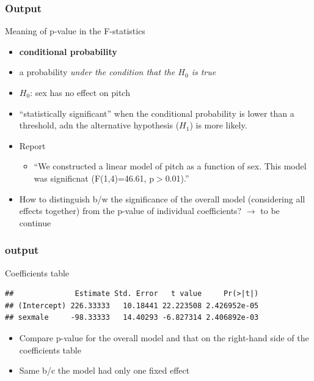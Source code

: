 \documentclass[10p]{beamer}\usepackage[]{graphicx}\usepackage[]{color}
\makeatletter
\newenvironment{kframe}{%
 \def\at@end@of@kframe{}%
 \ifinner\ifhmode%
  \def\at@end@of@kframe{\end{minipage}}%
  \begin{minipage}{\columnwidth}%
 \fi\fi%
 \def\FrameCommand##1{\hskip\@totalleftmargin \hskip-\fboxsep
 \colorbox{shadecolor}{##1}\hskip-\fboxsep
     \hskip-\linewidth \hskip-\@totalleftmargin \hskip\columnwidth}%
 \MakeFramed {\advance\hsize-\width
   \@totalleftmargin\z@ \linewidth\hsize
   \@setminipage}}%
 {\par\unskip\endMakeFramed%
 \at@end@of@kframe}
\newenvironment{knitrout}{}{} %
\makeatother
\begin{document}
\begin{frame}
\frametitle{Output}
Meaning of p-value in the F-statistics
\begin{itemize}
\item \textbf{conditional probability}
\item a probability \textit{under the condition that the $H_0$ is true}
\item $H_0$: sex has no effect on pitch
\item ``statistically significant'' when the conditional probability is lower than a threshold, adn the alternative hypothesis ($H_1$) is more likely.
\item Report
	\begin{itemize}
	\item ``We constructed a linear model of pitch as a function of sex. This model was significnat (F(1,4)=46.61, p$>$0.01).''
	\end{itemize}

\vspace{9pt}
\item How to distinguish b/w the significance of the overall model (considering all effects together) from the p-value of individual coefficients? $\rightarrow$ to be continue
\end{itemize}
\end{frame}

\begin{frame}[fragile]
\frametitle{output}
Coefficients table
\begin{knitrout}\scriptsize
{}\color{fgcolor}\begin{kframe}
\begin{verbatim}
##              Estimate Std. Error   t value     Pr(>|t|)
## (Intercept) 226.33333   10.18441 22.223508 2.426952e-05
## sexmale     -98.33333   14.40293 -6.827314 2.406892e-03
\end{verbatim}
\end{kframe}
\end{knitrout}
\begin{itemize}
\item Compare p-value for the overall model and that on the right-hand side of the coefficients table
\item Same b/c the model had only one fixed effect
\end{itemize}
\end{frame}
\end{document}
